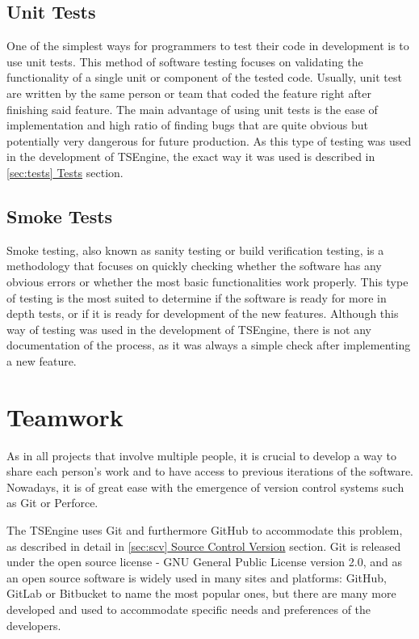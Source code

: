 \subsection{Unit Tests}
\hspace{\parindent}
One of the simplest ways for programmers to test their code in development is to use unit tests. This method of software testing focuses on validating the functionality of a single unit or component of the tested code. Usually, unit test are written by the same person or team that coded the feature right after finishing said feature. The main advantage of using unit tests is the ease of implementation and high ratio of finding bugs that are quite obvious but potentially very dangerous for future production. As this type of testing was used in the development of TSEngine, the exact way it was used is described in \hyperref[sec:tests]{\ref*{sec:tests} Tests} section.

\subsection{Smoke Tests}
\hspace{\parindent}
Smoke testing, also known as sanity testing or build verification testing, is a methodology that focuses on quickly checking whether the software has any obvious errors or whether the most basic functionalities work properly. This type of testing is the most suited to determine if the software is ready for more in depth tests, or if it is ready for development of the new features. Although this way of testing was used in the development of TSEngine, there is not any documentation of the process, as it was always a simple check after implementing a new feature.

\newpage
\section{Teamwork}
\label{sec:teamwork}
\hspace{\parindent} %

As in all projects that involve multiple people, it is crucial to develop a way to share each person's work and to have access to previous iterations of the software. Nowadays, it is of great ease with the emergence of version control systems such as Git or Perforce. 

The TSEngine uses Git and furthermore GitHub to accommodate this problem, as described in detail in \hyperref[sec:scv]{\ref*{sec:scv} Source Control Version} section. Git is released under the open source license -  GNU General Public License version 2.0, and as an open source software is widely used in many sites and platforms: GitHub, GitLab or Bitbucket to name the most popular ones, but there are many more developed and used to accommodate specific needs and preferences of the developers.

